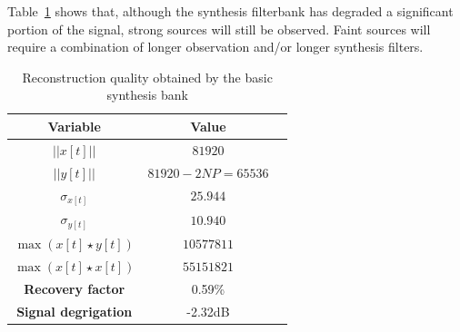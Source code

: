 \documentclass[a4paper,10pt]{article}
\begin{document}
Table~\ref{tab_quality} shows that, although the synthesis filterbank has degraded a significant portion of the signal, strong sources will still be observed. Faint
sources will require a combination of longer observation and/or longer synthesis filters. 
\begin{table}
  \centering
  \begin{tabular}{|c|c|c|}
    \hline
    \textbf{Variable} & \textbf{Value}  \\
    \hline
    $||x[t]||$ & $81920$ \\
    \hline
    $||y[t]||$ & $81920 - 2NP=65536$ \\
    \hline
    $\sigma_{x[t]}$ & $25.944$ \\
    \hline
    $\sigma_{y[t]}$ & $10.940$ \\
    \hline
    $\max{(x[t]\star y[t])}$ & $10 577 811$ \\
    \hline
    $\max{(x[t]\star x[t])}$ & $55 151 821$ \\
    \hline
    \textbf{Recovery factor} & 0.59\% \\
    \hline
    \textbf{Signal degrigation} & -2.32dB \\
    \hline
  \end{tabular}
  \caption[Reconstruction quality]{Reconstruction quality obtained by the basic synthesis bank}
  \label{tab_quality}
\end{table}
\end{document}
